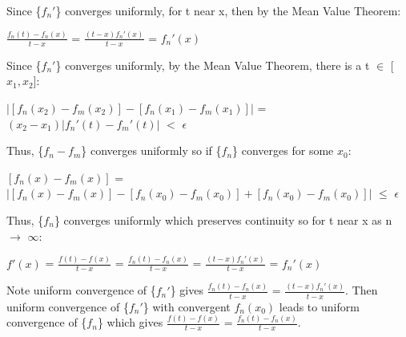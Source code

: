     \begin{intuition}
        Since \{$f_n'$\} converges uniformly, for t near x,
        then by the Mean Value Theorem:

        \hspace{0.5cm}
        $\frac{f_n(t) - f_n(x)}{t - x}$
        = $\frac{(t-x)f_n'(x)}{t - x}$
        = $f_n'(x)$

        Since \{$f_n'$\} converges uniformly, by the Mean Value Theorem,
        there is a t $\in$ [$x_1,x_2$]:

        \hspace{0.5cm}
        $|[f_n(x_2) - f_m(x_2)] - [f_n(x_1) - f_m(x_1)]|$
        = $(x_2 - x_1)|f_n'(t) - f_m'(t)|$ $<$ $\epsilon$

        Thus, \{$f_n - f_m$\} converges uniformly
        so if \{$f_n$\} converges for some $x_0$:

        \hspace{0.5cm}
        $[f_n(x) - f_m(x)]$
        = $|[f_n(x) - f_m(x)] - [f_n(x_0) - f_m(x_0)] + [f_n(x_0) - f_m(x_0)]|$
        $\leq$ $\epsilon$

        Thus, \{$f_n$\} converges uniformly which preserves continuity
        so for t near x as n $\rightarrow$ $\infty$:

        \hspace{0.5cm}
        $f'(x)$ = $\frac{f(t) - f(x)}{t-x}$
        = $\frac{f_n(t) - f_n(x)}{t - x}$
        = $\frac{(t-x)f_n'(x)}{t - x}$
        = $f_n'(x)$

        \vspace{0.2cm}

        Note uniform convergence of \{$f_n'$\} gives
        $\frac{f_n(t) - f_n(x)}{t - x}$ = $\frac{(t-x)f_n'(x)}{t - x}$.
        Then uniform convergence of \{$f_n'$\} with convergent $f_n(x_0)$
        leads to uniform convergence of \{$f_n$\} which gives
        $\frac{f(t) - f(x)}{t-x}$ = $\frac{f_n(t) - f_n(x)}{t - x}$.
    \end{intuition}

    \vspace{0.1cm}

